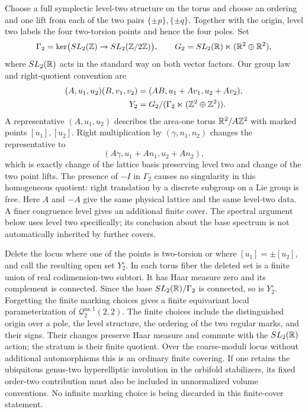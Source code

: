 Choose a full symplectic level-two structure on the torus and
choose an ordering and one lift from each of the two pairs
$\{\pm p\},\{\pm q\}$.  Together with the origin, level two
labels the four two-torsion points and hence the four poles.  Set
\[
 \Gamma_2=\ker\bigl(SL_2(\mathbb Z)\to SL_2(\mathbb Z/2\mathbb Z)\bigr),
 \qquad
 G_2=SL_2(\mathbb R)\ltimes(\mathbb R^2\oplus\mathbb R^2),
\]
where $SL_2(\mathbb R)$ acts in the standard way on both vector factors.
Our group law and right-quotient convention are
\begin{align}
 (A,u_1,u_2)(B,v_1,v_2)
   &=(AB,u_1+Av_1,u_2+Av_2),\\
 Y_2&=G_2/(\Gamma_2\ltimes(\mathbb Z^2\oplus\mathbb Z^2)).
 \label{eq:genus2Y2}
\end{align}
A representative $(A,u_1,u_2)$ describes the area-one torus
$\mathbb R^2/A\mathbb Z^2$ with marked points $[u_1],[u_2]$.
Right multiplication by $(\gamma,n_1,n_2)$ changes the
representative to
\[
 (A\gamma,u_1+An_1,u_2+An_2),
\]
which is exactly change of the lattice basis preserving level two
and change of the two point lifts.  The presence of $-I$ in
$\Gamma_2$ causes no singularity in this homogeneous quotient:
right translation by a discrete subgroup on a Lie group is free.
Here $A$ and $-A$ give the same physical lattice and the same
level-two data.  A finer congruence level gives an additional finite cover. The spectral
argument below uses level two specifically; its conclusion about the
base spectrum is not automatically inherited by further covers.

Delete the locus where one of the points is two-torsion or where
$[u_1]=\pm[u_2]$, and call the resulting open set $Y_2^\circ$.
In each torus fiber the deleted set is a finite union of real
codimension-two subtori.  It has Haar measure zero and its
complement is connected.  Since the base $SL_2(\mathbb R)/\Gamma_2$ is
connected, so is $Y_2^\circ$.
Forgetting the finite marking choices gives a finite equivariant
local parameterization of $\mathcal Q^{\mathrm{ns},1}_2(2,2)$.
The finite choices include the distinguished origin over a pole,
the level structure, the ordering of the two regular marks, and
their signs.  Their changes preserve Haar measure and commute
with the $SL_2(\mathbb R)$ action; the stratum is their finite quotient.
Over the coarse-moduli locus without additional automorphisms
this is an ordinary finite covering.  If one retains the
ubiquitous genus-two hyperelliptic involution in the orbifold
stabilizers, its fixed order-two contribution must also be
included in unnormalized volume conventions.  No infinite
marking choice is being discarded in this finite-cover statement.

